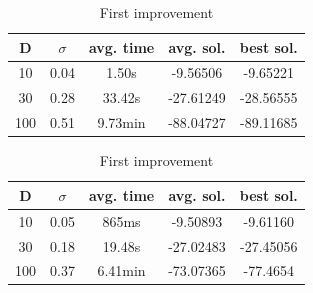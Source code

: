 \documentclass{article}
\begin{document}
\begin{table}[htbp]
\begin{minipage}{.4\linewidth}
    \centering

    \begin{tabular}{|c|c|c|c|c|}
    \hline
    D   & $\sigma$  & avg. time     & avg. sol.     & best sol. \\
    \hline
    10  & 0.04      & 1.50s         & -9.56506      & -9.65221 \\
    \hline
    30  & 0.28      & 33.42s        & -27.61249     & -28.56555 \\
    \hline
    100 & 0.51      & 9.73min       & -88.04727     & -89.11685 \\
    \hline
    \end{tabular}
    \caption{Best improvement}
  \end{minipage}%
  \quad %
  \begin{minipage}{.75\linewidth}
    \centering

    \begin{tabular}{|c|c|c|c|c|}
    \hline
    D   & $\sigma$  & avg. time     & avg. sol.     & best sol. \\
    \hline
    10  & 0.05      & 865ms         & -9.50893      & -9.61160 \\
    \hline
    30  & 0.18      & 19.48s        & -27.02483     & -27.45056 \\
    \hline
    100 & 0.37      & 6.41min       & -73.07365     & -77.4654  \\
    \hline
    \end{tabular}
    \caption{First improvement}
  \end{minipage}
\end{table}
\end{document}
